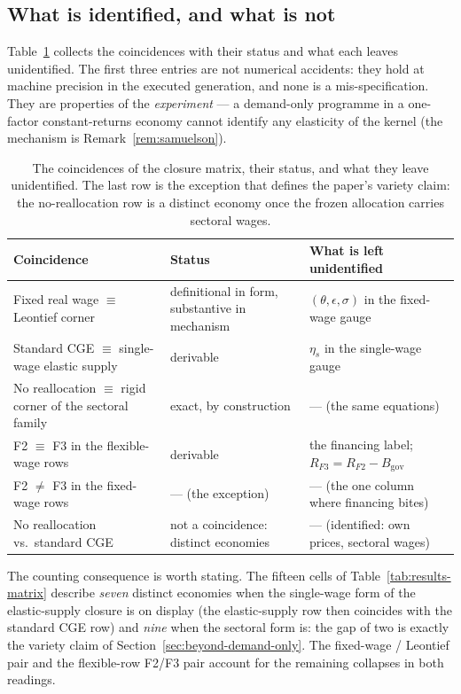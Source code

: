 \subsection{What is identified, and what is not}\label{app:eqclass}

Table~\ref{tab:equiv-class} collects the coincidences with their status and
what each leaves unidentified. The first three entries are not numerical
accidents: they hold at machine precision in the executed generation, and
none is a mis-specification. They are properties of the \emph{experiment}
--- a demand-only programme in a one-factor constant-returns economy cannot
identify any elasticity of the kernel (the mechanism is
Remark~\ref{rem:samuelson}).

\begin{table}[htbp]
\centering
\small
\begin{tabular}{@{}p{5.4cm}p{3.0cm}p{5.0cm}@{}}
\toprule
Coincidence & Status & What is left unidentified \\
\midrule
Fixed real wage $\equiv$ Leontief corner
  & definitional in form, substantive in mechanism
  & $(\theta,\epsilon,\sigma)$ in the fixed-wage gauge \\
Standard CGE $\equiv$ single-wage elastic supply
  & derivable
  & $\eta_s$ in the single-wage gauge \\
No reallocation $\equiv$ rigid corner of the sectoral family
  & exact, by construction
  & --- (the same equations) \\
F2 $\equiv$ F3 in the flexible-wage rows
  & derivable
  & the financing label; $R_{F3}=R_{F2}-B_{\mathrm{gov}}$ \\
F2 $\neq$ F3 in the fixed-wage rows
  & --- (the exception)
  & --- (the one column where financing bites) \\
No reallocation vs.\ standard CGE
  & not a coincidence: distinct economies
  & --- (identified: own prices, sectoral wages) \\
\bottomrule
\end{tabular}
\caption{The coincidences of the closure matrix, their status, and what they
leave unidentified. The last row is the exception that defines the paper's
variety claim: the no-reallocation row is a distinct economy once the frozen
allocation carries sectoral wages.}
\label{tab:equiv-class}
\end{table}

The counting consequence is worth stating. The fifteen cells of
Table~\ref{tab:results-matrix} describe \emph{seven} distinct economies when
the single-wage form of the elastic-supply closure is on display (the
elastic-supply row then coincides with the standard CGE row) and
\emph{nine} when the sectoral form is: the gap of two is exactly the
variety claim of Section~\ref{sec:beyond-demand-only}. The fixed-wage /
Leontief pair and the flexible-row F2/F3 pair account for the remaining
collapses in both readings.

